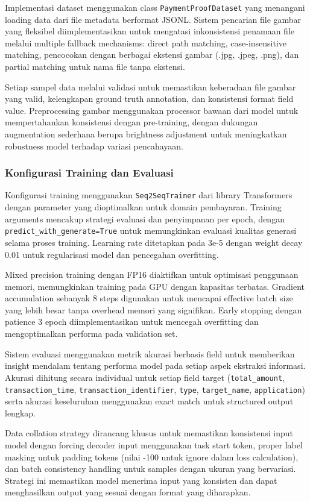 Implementasi dataset menggunakan class \texttt{PaymentProofDataset} yang menangani loading data dari file metadata berformat JSONL. Sistem pencarian file gambar yang fleksibel diimplementasikan untuk mengatasi inkonsistensi penamaan file melalui multiple fallback mechanisms: direct path matching, case-insensitive matching, pencocokan dengan berbagai ekstensi gambar (.jpg, .jpeg, .png), dan partial matching untuk nama file tanpa ekstensi.

Setiap sampel data melalui validasi untuk memastikan keberadaan file gambar yang valid, kelengkapan ground truth annotation, dan konsistensi format field value. Preprocessing gambar menggunakan processor bawaan dari model \donutcord{} untuk mempertahankan konsistensi dengan pre-training, dengan dukungan augmentation sederhana berupa brightness adjustment untuk meningkatkan robustness model terhadap variasi pencahayaan.

\subsubsection{Konfigurasi Training dan Evaluasi}
\label{subsubsec:konfigurasi-training}

Konfigurasi training menggunakan \texttt{Seq2SeqTrainer} dari library Transformers dengan parameter yang dioptimalkan untuk domain pembayaran. Training arguments mencakup strategi evaluasi dan penyimpanan per epoch, dengan \texttt{predict\_with\_generate=True} untuk memungkinkan evaluasi kualitas generasi selama proses training. Learning rate ditetapkan pada 3e-5 dengan weight decay 0.01 untuk regularisasi model dan pencegahan overfitting.

Mixed precision training dengan FP16 diaktifkan untuk optimisasi penggunaan memori, memungkinkan training pada GPU dengan kapasitas terbatas. Gradient accumulation sebanyak 8 steps digunakan untuk mencapai effective batch size yang lebih besar tanpa overhead memori yang signifikan. Early stopping dengan patience 3 epoch diimplementasikan untuk mencegah overfitting dan mengoptimalkan performa pada validation set.

Sistem evaluasi menggunakan metrik akurasi berbasis field untuk memberikan insight mendalam tentang performa model pada setiap aspek ekstraksi informasi. Akurasi dihitung secara individual untuk setiap field target (\texttt{total\_amount}, \texttt{transaction\_time}, \texttt{transaction\_identifier}, \texttt{type}, \texttt{target\_name}, \texttt{application}) serta akurasi keseluruhan menggunakan exact match untuk structured output lengkap.

Data collation strategy dirancang khusus untuk memastikan konsistensi input model dengan forcing decoder input menggunakan task start token, proper label masking untuk padding tokens (nilai -100 untuk ignore dalam loss calculation), dan batch consistency handling untuk samples dengan ukuran yang bervariasi. Strategi ini memastikan model menerima input yang konsisten dan dapat menghasilkan output yang sesuai dengan format yang diharapkan.